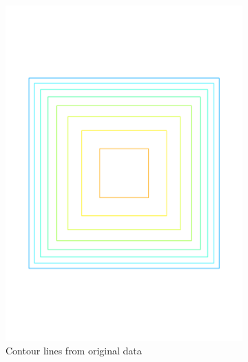 \begin{figure}
\begin{subfigure}[b]{0.3\linewidth}
    \includegraphics[width=\textwidth]{figs/pyramid_o_cl}
    \caption{Contour lines from original data}
  \end{subfigure}  
  \quad
  \begin{subfigure}[b]{0.3\linewidth}
    \centering

\end{subfigure}
\end{figure}
